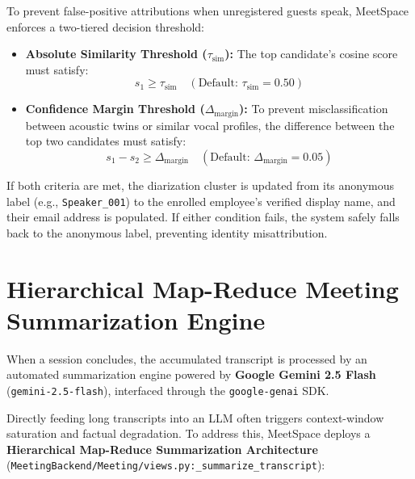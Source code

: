 \documentclass[12pt,oneside,letterpaper]{report}
\numberwithin{equation}{chapter} %
\begin{document}
\begin{enumerate}
    To prevent false-positive attributions when unregistered guests speak, MeetSpace enforces a two-tiered decision threshold:
    \begin{itemize}
        \item \textbf{Absolute Similarity Threshold ($\tau_{\text{sim}}$):} The top candidate's cosine score must satisfy:
        \begin{equation}
        s_1 \ge \tau_{\text{sim}} \quad (\text{Default: } \tau_{\text{sim}} = 0.50)
        \label{eq:sim_thresh}
        \end{equation}
        \item \textbf{Confidence Margin Threshold ($\Delta_{\text{margin}}$):} To prevent misclassification between acoustic twins or similar vocal profiles, the difference between the top two candidates must satisfy:
        \begin{equation}
        s_1 - s_2 \ge \Delta_{\text{margin}} \quad (\text{Default: } \Delta_{\text{margin}} = 0.05)
        \label{eq:margin_thresh}
        \end{equation}
    \end{itemize}
\end{enumerate}

If both criteria are met, the diarization cluster is updated from its anonymous label (e.g., \texttt{Speaker\_001}) to the enrolled employee's verified display name, and their email address is populated. If either condition fails, the system safely falls back to the anonymous label, preventing identity misattribution.

\section{Hierarchical Map-Reduce Meeting Summarization Engine}
When a session concludes, the accumulated transcript is processed by an automated summarization engine powered by \textbf{Google Gemini 2.5 Flash} (\texttt{gemini-2.5-flash}), interfaced through the \texttt{google-genai} SDK.

Directly feeding long transcripts into an LLM often triggers context-window saturation and factual degradation. To address this, MeetSpace deploys a \textbf{Hierarchical Map-Reduce Summarization Architecture} (\texttt{MeetingBackend/Meeting/views.py:\_summarize\_transcript}):
\end{document}
